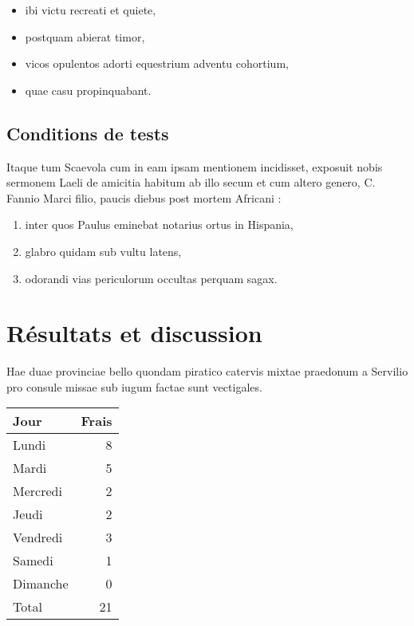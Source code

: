 \documentclass[french]{report}
\begin{document}
\begin{itemize}
\item ibi victu recreati et quiete,
\item postquam abierat timor,
\item vicos opulentos adorti equestrium adventu cohortium,
\item quae casu propinquabant.
\end{itemize}

\section{Conditions de tests}
\label{sec:orgc02e45d}

Itaque tum Scaevola cum in eam ipsam mentionem incidisset, exposuit nobis
sermonem Laeli de amicitia habitum ab illo secum et cum altero genero, C. Fannio
Marci filio, paucis diebus post mortem Africani :

\begin{enumerate}
\item inter quos Paulus eminebat notarius ortus in Hispania,
\item glabro quidam sub vultu latens,
\item odorandi vias periculorum occultas perquam sagax.
\end{enumerate}

\chapter{Résultats et discussion}
\label{sec:org0243216}

Hae duae provinciae bello quondam piratico catervis mixtae praedonum a Servilio
pro consule missae sub iugum factae sunt vectigales.

\begin{table}[!htbp]
\label{tab:org0c46daf}
\centering
\begin{tabular}{lr}
Jour & Frais\\
\hline
Lundi & 8\\
Mardi & 5\\
Mercredi & 2\\
Jeudi & 2\\
Vendredi & 3\\
Samedi & 1\\
Dimanche & 0\\
\hline
Total & 21\\
\end{tabular}
\end{table}
\end{document}
